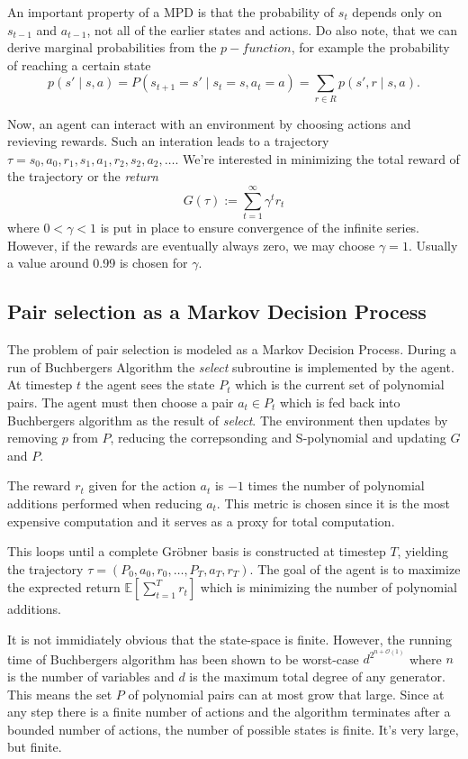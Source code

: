 \documentclass{article}
\theoremstyle{changedot}
\theoremstyle{changedotbreak}
\theoremstyle{nonumberplain}
\newcommand{\m}{\mathbb}
\begin{document}
An important property of a MPD is that the probability of $s_{t}$ depends only on $s_{t-1}$ and $a_{t-1}$, not all of the earlier states and actions. Do also note, that we can derive marginal probabilities from the $p-function$, for example the probability of reaching a certain state \[p(s' \mid s, a) = P(s_{t+1} = s' \mid s_{t} = s, a_{t} = a) = \sum_{r \in R} p(s', r \mid s, a).\]

Now, an agent can interact with an environment by choosing actions and revieving rewards. Such an interation leads to a trajectory $\tau = s_{0}, a_{0}, r_{1}, s_{1}, a_{1}, r_{2}, s_{2}, a_{2}, \dots$. We're interested in minimizing the total reward of the trajectory or the \emph{return} \[G(\tau) := \sum_{t=1}^{\infty} \gamma^{t} r_{t}\] where $0 < \gamma < 1$ is put in place to ensure convergence of the infinite series. However, if the rewards are eventually always zero, we may choose $\gamma = 1$. Usually a value around 0.99 is chosen for $\gamma$.

\subsection{Pair selection as a Markov Decision Process}
The problem of pair selection is modeled as a Markov Decision Process. During a run of Buchbergers Algorithm the \emph{select} subroutine is implemented by the agent. At timestep $t$ the agent sees the state $P_{t}$ which is the current set of polynomial pairs. The agent must then choose a pair $a_{t} \in P_{t}$ which is fed back into Buchbergers algorithm as the result of \emph{select}. The environment then updates by removing $p$ from $P$, reducing the correpsonding and S-polynomial and updating $G$ and $P$.

The reward $r_{t}$ given for the action $a_{t}$ is $-1$ times the number of polynomial additions performed when reducing $a_{t}$. This metric is chosen since it is the most expensive computation and it serves as a proxy for total computation.

This loops until a complete Gröbner basis is constructed at timestep $T$, yielding the trajectory $\tau = (P_{0}, a_{0}, r_{0}, \dots, P_{T}, a_{T}, r_{T})$. The goal of the agent is to maximize the exprected return $\m E[\sum_{t=1}^{T} r_{t}]$ which is minimizing the number of polynomial additions.

It is not immidiately obvious that the state-space is finite. However, the running time of Buchbergers algorithm has been shown to be worst-case $d^{2^{n+\mathcal{O}(1)}}$ where $n$ is the number of variables and $d$ is the maximum total degree of any generator. This means the set $P$ of polynomial pairs can at most grow that large. Since at any step there is a finite number of actions and the algorithm terminates after a bounded number of actions, the number of possible states is finite. It's very large, but finite.
\end{document}
